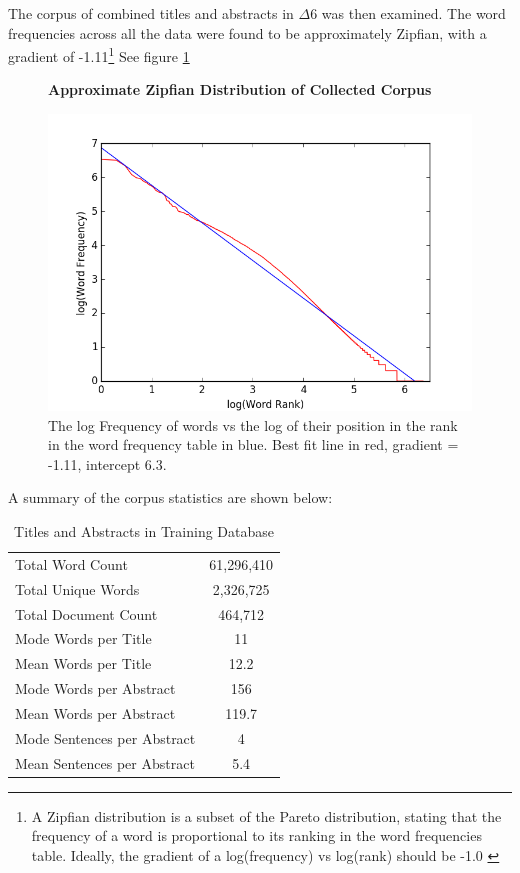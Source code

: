 The corpus of combined titles and abstracts in $\Delta6$ was then examined. The word frequencies across all the data were found to be approximately Zipfian, with a gradient of -1.11\footnote{A Zipfian distribution is a subset of the Pareto distribution, stating that the frequency of a word is proportional to its ranking in the word frequencies table. Ideally, the gradient of a log(frequency) vs log(rank) should be -1.0 \cite{zipf}} See figure \ref{fig:ZIPF}
\begin{figure}[H]
    \centering
    \textbf{Approximate Zipfian Distribution of Collected Corpus}\par\medskip
    \includegraphics[scale=0.6]{Data_Acquisition/zipf.png}
    \caption[Zipfian Plot of Collected Corpus]{The log Frequency of words vs the log of their position in the rank in the word frequency table in blue. Best fit line in red, gradient = -1.11, intercept 6.3. }
     \label{fig:ZIPF}
\end{figure}
A summary of the corpus statistics are shown below:
\begin{table}[h!]
\caption{Titles and Abstracts in Training Database}
\label{tab:CORPUS STATS}
\begin{center}
\begin{tabular}{||l|c||}
\hline
Total Word Count & 61,296,410\\
Total Unique Words & 2,326,725\\
Total Document Count & 464,712\\
Mode Words per Title &  11\\
Mean Words per Title &  12.2\\
Mode Words per Abstract & 156\\
Mean Words per Abstract & 119.7\\
Mode Sentences per Abstract & 4\\
Mean Sentences per Abstract & 5.4\\
\hline
\end{tabular}
\end{center}
\end{table}

\label{sec:SCRAPEANALYSIS}
